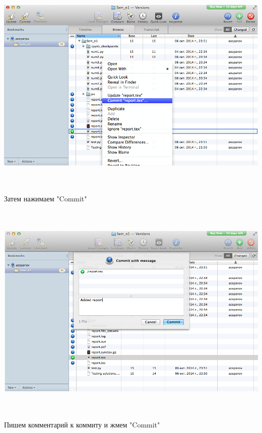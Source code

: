 \documentclass[12pt, a4paper]{article}
\begin{document}
			\begin{center}
				\includegraphics[height=10.5cm]{svn/svn_6.png}

				Затем нажимаем "Commit" \\
			\end{center}

			\begin{center}
				\includegraphics[height=10.5cm]{svn/svn_7.png}

				Пишем комментарий к коммиту и жмем "Commit" \\
				~\newline
			\end{center}
\end{document}
